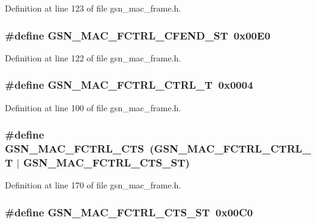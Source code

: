 Definition at line 123 of file gsn\_\-mac\_\-frame.h.

\hypertarget{a00523_ada0401d2fcecac8045f747158a1c19c1}{
\subsubsection[{GSN\_\-MAC\_\-FCTRL\_\-CFEND\_\-ST}]{\setlength{\rightskip}{0pt plus 5cm}\#define GSN\_\-MAC\_\-FCTRL\_\-CFEND\_\-ST~0x00E0}}
\label{a00523_ada0401d2fcecac8045f747158a1c19c1}


Definition at line 122 of file gsn\_\-mac\_\-frame.h.

\hypertarget{a00523_a0c03d1bd8daffa50ebc27e1d3452b695}{
\subsubsection[{GSN\_\-MAC\_\-FCTRL\_\-CTRL\_\-T}]{\setlength{\rightskip}{0pt plus 5cm}\#define GSN\_\-MAC\_\-FCTRL\_\-CTRL\_\-T~0x0004}}
\label{a00523_a0c03d1bd8daffa50ebc27e1d3452b695}


Definition at line 100 of file gsn\_\-mac\_\-frame.h.

\hypertarget{a00523_a7c226906bac26ada2865cbc09c08a85b}{
\subsubsection[{GSN\_\-MAC\_\-FCTRL\_\-CTS}]{\setlength{\rightskip}{0pt plus 5cm}\#define GSN\_\-MAC\_\-FCTRL\_\-CTS~(GSN\_\-MAC\_\-FCTRL\_\-CTRL\_\-T    $|$ GSN\_\-MAC\_\-FCTRL\_\-CTS\_\-ST)}}
\label{a00523_a7c226906bac26ada2865cbc09c08a85b}


Definition at line 170 of file gsn\_\-mac\_\-frame.h.

\hypertarget{a00523_ac3a5c9c88e69c3f2b076bb89504f7c55}{
\subsubsection[{GSN\_\-MAC\_\-FCTRL\_\-CTS\_\-ST}]{\setlength{\rightskip}{0pt plus 5cm}\#define GSN\_\-MAC\_\-FCTRL\_\-CTS\_\-ST~0x00C0}}
\label{a00523_ac3a5c9c88e69c3f2b076bb89504f7c55}


